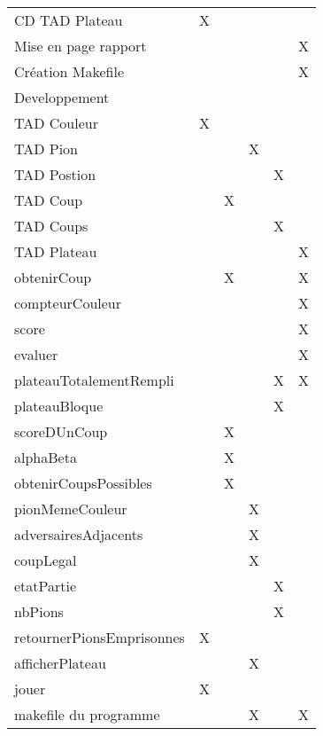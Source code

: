 \documentclass{article}
\begin{document}
\begin{tabular}{|l|c|c|c|c|c|}
  CD TAD Plateau & X & & & & \\                              
  Mise en page rapport & & & & & X \\      
  Création Makefile & & & & & X \\
  \hline
  Developpement \\
  \hline
  TAD Couleur & X & & & & \\                                                                                                                                                                       
  TAD Pion & & & X & & \\                                                                                                                                                                              
  TAD Postion & & & & X &  \\                                                                                                                                                                          
  TAD Coup & & X & &  & \\                                                                                                                                                                              
  TAD Coups & & & & X & \\                                                                                                                                                                             
  TAD Plateau & & & & & X \\                                                                                                                                                                      
  obtenirCoup & & X & & & X \\
  compteurCouleur & & & & & X \\
  score & & & & & X \\
  evaluer & & & & & X \\
  plateauTotalementRempli & & & & X & X \\
  plateauBloque & & & & X & \\
  scoreDUnCoup & & X & & & \\
  alphaBeta & & X & & & \\
  obtenirCoupsPossibles & & X & & & \\
  pionMemeCouleur & & & X & & \\
  adversairesAdjacents & & & X & & \\
  coupLegal & & & X & & \\
  etatPartie & & & & X & \\
  nbPions & & & & X & \\
  retournerPionsEmprisonnes & X & & & & \\
  afficherPlateau & & & X & & \\
  jouer & X & & & & \\
  makefile du programme & & & X & & X \\
 \end{tabular}   
\end{document}
